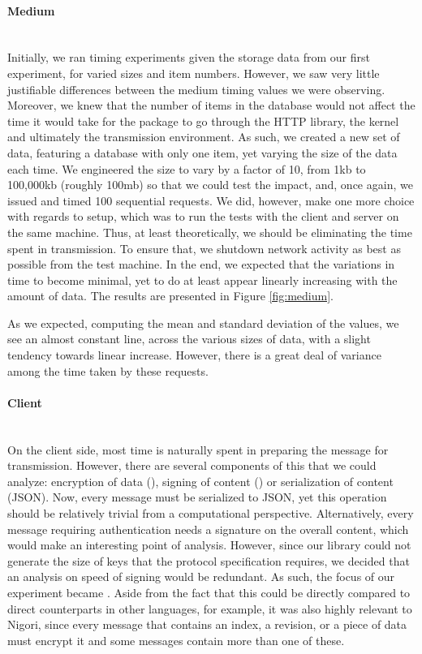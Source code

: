 \paragraph{Medium} ~\\
Initially, we ran timing experiments given the storage data from our first experiment, for varied sizes and item numbers.
However, we saw very little justifiable differences between the medium timing values we were observing.
Moreover, we knew that the number of items in the database would not affect the time it would take for the package to go through the HTTP library, the kernel and ultimately the transmission environment.
As such, we created a new set of data, featuring a database with only one item, yet varying the size of the data each time.
We engineered the size to vary by a factor of 10, from 1kb to 100,000kb (roughly 100mb) so that we could test the impact, and, once again, we issued and timed 100 sequential  requests.
We did, however, make one more choice with regards to setup, which was to run the tests with the client and server on the same machine.
Thus, at least theoretically, we should be eliminating the time spent in transmission.
To ensure that, we shutdown network activity as best as possible from the test machine.
In the end, we expected that the variations in time to become minimal, yet to do at least appear linearly increasing with the amount of data.
The results are presented in Figure \ref{fig:medium}.


As we expected, computing the mean and standard deviation of the values, we see an almost constant line, across the various sizes of data, with a slight tendency towards linear increase.
However, there is a great deal of variance among the time taken by these requests.

\paragraph{Client} ~\\
On the client side, most time is naturally spent in preparing the message for transmission.
However, there are several components of this that we could analyze: encryption of data (), signing of content () or serialization of content (JSON).
Now, every message must be serialized to JSON, yet this operation should be relatively trivial from a computational perspective.
Alternatively, every message requiring authentication needs a signature on the overall content, which would make  an interesting point of analysis.
However, since our library could not generate the size of keys that the protocol specification requires, we decided that an analysis on speed of signing would be redundant.
As such, the focus of our experiment became .
Aside from the fact that this could be directly compared to direct counterparts in other languages, for example, it was also highly relevant to Nigori, since every message that contains an index, a revision, or a piece of data must encrypt it and some messages contain more than one of these.

